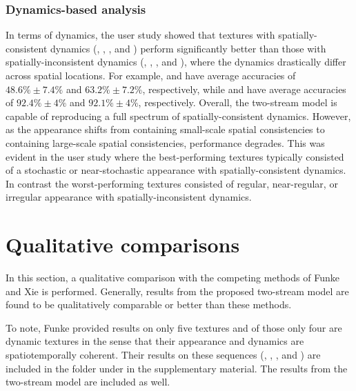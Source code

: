 

\subsubsection{Dynamics-based analysis}

In terms of dynamics, the user study showed that textures with
spatially-consistent dynamics (\eg, , 
, and  ) perform 
significantly better than those with spatially-inconsistent 
dynamics (\eg, , , 
and ), where the dynamics drastically differ 
across spatial locations.
For example,  and 
have average accuracies of $48.6\% \pm 7.4\%$ and
$63.2\% \pm 7.2\%$, respectively, while
 and  have average 
accuracies of $92.4\% \pm 4\%$ and $92.1\% \pm 4\%$, 
respectively.
Overall, the two-stream model is capable of reproducing a full spectrum
of spatially-consistent dynamics.
However, as the appearance shifts from containing small-scale 
spatial consistencies to containing large-scale spatial consistencies,
performance degrades.
This was evident in the user study where the best-performing 
textures typically consisted of a stochastic or
near-stochastic appearance with spatially-consistent 
dynamics.
In contrast the worst-performing textures consisted of
regular, near-regular, or irregular appearance with
spatially-inconsistent dynamics.

\section{Qualitative comparisons}

In this section, a qualitative comparison with the competing methods of Funke 
\etal \cite{funke2017} and Xie \etal \cite{xie2017synthesizing} is performed. 
Generally, results from the proposed two-stream model are found to be qualitatively comparable or better than these methods.

To note, Funke \etal \cite{funke2017} provided results on
only five textures and of those only four
are dynamic textures in the sense that their appearance
and dynamics are spatiotemporally coherent.
Their results on these sequences (, , 
, and ) are included in the folder
 under  in the supplementary material.
The results from the two-stream model are included as well.

